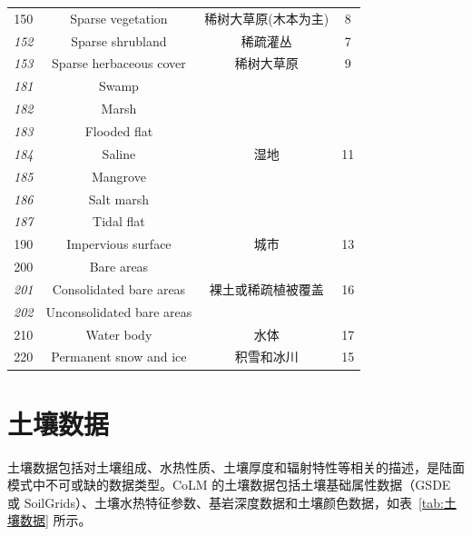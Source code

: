 \begin{table}[htbp]
\begin{tabular}{cccc}
%
    \cline{1-4} 150 & Sparse vegetation & 稀树大草原(木本为主) & 8 \\
%
    \cline{1-4} \textit{152} & Sparse shrubland & 稀疏灌丛 & 7 \\
%
    \cline{1-4} \textit{153} & Sparse herbaceous cover & 稀树大草原 & 9 \\
%
    \cline{1-4} \textit{181} & Swamp & \multirow{7}{*}{湿地} & \multirow{7}{*}{11} \\
    \textit{182} & Marsh & & \\
    \textit{183} & Flooded flat & & \\
    \textit{184} & Saline & & \\
    \textit{185} & Mangrove & & \\
    \textit{186} & Salt marsh & & \\
    \textit{187} & Tidal flat & & \\
%
    \cline{1-4} 190 & Impervious surface & 城市 & 13 \\
%
    \cline{1-4} 200 & Bare areas & \multirow{3}{*}{裸土或稀疏植被覆盖} & \multirow{3}{*}{16} \\
    \textit{201} & Consolidated bare areas & & \\
    \textit{202} & Unconsolidated bare areas & & \\
%
    \cline{1-4} 210 & Water body & 水体 & 17 \\
%
    \cline{1-4} 220 & Permanent snow and ice & 积雪和冰川 & 15 \\
%
    \bottomrule
  \end{tabular}
\end{table}


\section{土壤数据}\label{土壤数据}

土壤数据包括对土壤组成、水热性质、土壤厚度和辐射特性等相关的描述，是陆面模式中不可或缺的数据类型。CoLM 的土壤数据包括土壤基础属性数据（GSDE 或 SoilGrids）、土壤水热特征参数、基岩深度数据和土壤颜色数据，如表~\ref{tab:土壤数据} 所示。

